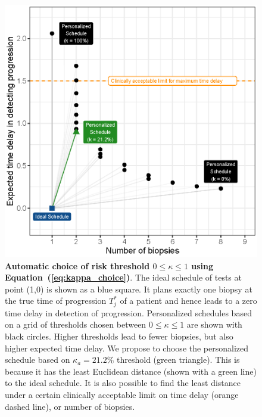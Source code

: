 \begin{figure}
\centerline{\includegraphics{images/kappa_choice_102.eps}}
\caption{\textbf{Automatic choice of risk threshold $0 \leq \kappa \leq 1$ using Equation~(\ref{eq:kappa_choice})}. The ideal schedule of tests at point (1,0) is shown as a blue square. It plans exactly one biopsy at the true time of progression $T^*_j$ of a patient and hence leads to a zero time delay in detection of progression. Personalized schedules based on a grid of thresholds chosen between $0 \leq \kappa \leq 1$ are shown with black circles. Higher thresholds lead to fewer biopsies, but also higher expected time delay. We propose to choose the personalized schedule based on $\kappa_a=21.2\%$ threshold (green triangle). This is because it has the least Euclidean distance (shown with a green line) to the ideal schedule. It is also possible to find the least distance under a certain clinically acceptable limit on time delay (orange dashed line), or number of biopsies.}
\label{fig:kappa_choice}
\end{figure}

